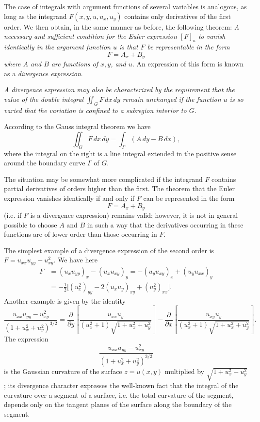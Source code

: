 The case of integrals with argument functions of several variables is analogous, as long as the integrand $F(x,y,u,u_x,u_y)$ contains only derivatives of the first order. We then obtain, in the same manner as before, the following theorem: \emph{A necessary and sufficient condition for the Euler expression $[F]_u$ to vanish identically in the argument function $u$ is that $F$ be representable in the form}
\[
F=A_x+B_y
\]
\emph{where $A$ and $B$ are functions of $x,y$, and $u$.} An expression of this form is known as a \emph{divergence expression}.

\emph{A divergence expression may also be characterized by the requirement that the value of the double integral $\iint_G F\,dx\,dy$ remain unchanged if the function $u$ is so varied that the variation is confined to a subregion interior to $G$.}

According to the Gauss integral theorem we have
\[
\iint_G F\,dx\,dy=\int_\Gamma(A\,dy-B\,dx),
\]
where the integral on the right is a line integral extended in the positive sense around the boundary curve $\Gamma$ of $G$.

The situation may be somewhat more complicated if the integrand $F$ contains partial derivatives of orders higher than the first. The theorem that the Euler expression vanishes identically if and only if $F$ can be represented in the form
\[
F=A_x+B_y
\]
(i.e. if $F$ is a divergence expression) remains valid; however, it is not in general possible to choose $A$ and $B$ in such a way that the derivatives occurring in these functions are of lower order than those occurring in $F$.

The simplest example of a divergence expression of the second order is $F=u_{xx}u_{yy}-u_{xy}^2$. We have here
\begin{align*}
F&=(u_xu_{yy})_x-(u_xu_{xy})_y
=-(u_yu_{xy})_x+(u_yu_{xx})_y\\
&=-\frac12\bigl[(u_x^2)_{yy}-2(u_xu_y)_{xy}+(u_y^2)_{xx}\bigr].
\end{align*}
Another example is given by the identity
\[
\frac{u_{xx}u_{yy}-u_{xy}^2}{(1+u_x^2+u_y^2)^{3/2}}
=\frac{\partial}{\partial y}\left[
\frac{u_{xx}u_y}{(u_x^2+1)\sqrt{1+u_x^2+u_y^2}}
\right]
-\frac{\partial}{\partial x}\left[
\frac{u_{xy}u_y}{(u_x^2+1)\sqrt{1+u_x^2+u_y^2}}
\right].
\]
The expression
\[
\frac{u_{xx}u_{yy}-u_{xy}^2}{(1+u_x^2+u_y^2)^{3/2}}
\]
is the Gaussian curvature of the surface $z=u(x,y)$ multiplied by $\sqrt{1+u_x^2+u_y^2}$; its divergence character expresses the well-known fact that the integral of the curvature over a segment of a surface, i.e. the total curvature of the segment, depends only on the tangent planes of the surface along the boundary of the segment.

